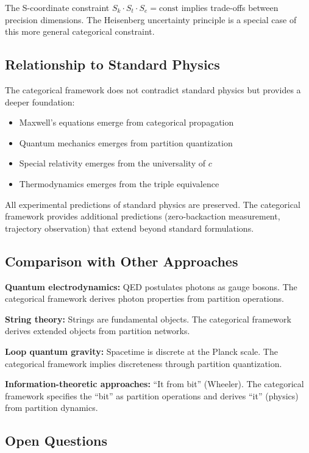 \documentclass[aps,prl,twocolumn,superscriptaddress,floatfix]{revtex4-2}
\begin{document}
The S-coordinate constraint $S_k \cdot S_t \cdot S_e = \text{const}$ implies trade-offs between precision dimensions. The Heisenberg uncertainty principle is a special case of this more general categorical constraint.

\subsection{Relationship to Standard Physics}

The categorical framework does not contradict standard physics but provides a deeper foundation:

\begin{itemize}
\item Maxwell's equations emerge from categorical propagation
\item Quantum mechanics emerges from partition quantization
\item Special relativity emerges from the universality of $c$
\item Thermodynamics emerges from the triple equivalence
\end{itemize}

All experimental predictions of standard physics are preserved. The categorical framework provides additional predictions (zero-backaction measurement, trajectory observation) that extend beyond standard formulations.

\subsection{Comparison with Other Approaches}

\textbf{Quantum electrodynamics:} QED postulates photons as gauge bosons. The categorical framework derives photon properties from partition operations.

\textbf{String theory:} Strings are fundamental objects. The categorical framework derives extended objects from partition networks.

\textbf{Loop quantum gravity:} Spacetime is discrete at the Planck scale. The categorical framework implies discreteness through partition quantization.

\textbf{Information-theoretic approaches:} ``It from bit'' (Wheeler). The categorical framework specifies the ``bit'' as partition operations and derives ``it'' (physics) from partition dynamics.

\subsection{Open Questions}
\end{document}
